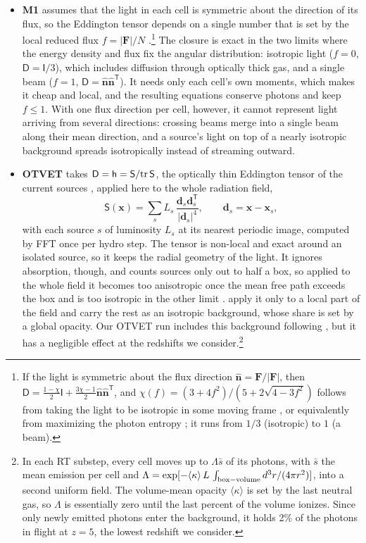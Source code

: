 \documentclass[iop]{openjournal}
\newcommand{\T}{^{\mathsf T}}
\begin{document}
\begin{itemize}
\item \textbf{M1}
assumes that the light in each cell is symmetric about the direction of
its flux, so the Eddington tensor depends on a single number that is set by
the local reduced flux $f=|\mathbf{F}|/N$ \citep{levermore84,dubroca99}.\footnote{If the light is symmetric about
the flux direction $\hat{\mathbf{n}}=\mathbf F/|\mathbf F|$, then
$\mathsf{D}=\frac{1-\chi}{2}\mathsf{I}+\frac{3\chi-1}{2}\hat{\mathbf{n}}\hat{\mathbf{n}}\T$,
and $\chi(f)=(3+4f^2)/(5+2\sqrt{4-3f^2})$ follows from taking the light
to be isotropic in some moving frame \citep{levermore84}, or equivalently
from maximizing the photon entropy \citep{dubroca99}; it runs from
$1/3$ (isotropic) to $1$ (a beam).}
The closure is exact in the two limits where the energy density and flux fix
the angular distribution: isotropic light ($f=0$, $\mathsf{D}=\mathsf{I}/3$),
which includes diffusion through optically thick gas, and a single beam
($f=1$, $\mathsf{D}=\hat{\mathbf{n}}\hat{\mathbf{n}}\T$). It needs only each
cell's own moments, which makes it cheap and local, and the resulting
equations conserve photons and keep $f\le1$. With
one flux direction per cell, however, it cannot represent light arriving
from several directions: crossing beams merge into a single beam along
their mean direction, and a source's light on top of a nearly isotropic
background spreads isotropically instead of streaming outward. 

\item \textbf{OTVET} takes $\mathsf D=\mathsf h=\mathsf S/{\rm tr}\,\mathsf S$,
  the optically thin Eddington tensor of the current sources
  \citep{gnedin01}, applied here to the whole radiation field,
  \begin{equation}
  \mathsf S(\mathbf x)=\sum_s L_s\,\frac{\mathbf d_s\mathbf d_s\T}{|\mathbf d_s|^4},
  \qquad \mathbf d_s=\mathbf x-\mathbf x_s,
  \label{eqn:otvet}
  \end{equation}
  with each source $s$ of luminosity $L_s$ at its nearest periodic image,
  computed by FFT once per hydro step. The tensor is non-local and exact
  around an isolated source, so it keeps the radial geometry of the
  light. It ignores absorption, though, and counts sources only out to
  half a box, so applied to the whole field it becomes too anisotropic
  once the mean free path exceeds the box and is too isotropic in the other limit \citep{wu21}. \citet{gnedin01} apply it only to a local part of the field
  and carry the rest as an isotropic background, whose share is set by a
  global opacity. Our OTVET run includes this background following
  \citet{gnedin01}, but it has a negligible effect at the redshifts we consider.\footnote{In each RT substep, every cell moves up to $\Lambda\bar s$ of its photons, with $\bar s$ the mean emission per cell and
 $\Lambda=\exp[-\langle\kappa\rangle \, L\, \int_{\rm box-volume}d^3r/(4\pi r^2) ]$, into a
   second uniform field.  The volume-mean opacity $\langle\kappa\rangle$ is set by the
   last neutral gas, so $\Lambda$ is essentially zero until the last percent of the
 volume ionizes. Since only newly emitted photons enter the background, it holds 2\% of the
   photons in flight at $z=5$, the lowest redshift we consider.}
  

\end{itemize}
\end{document}
